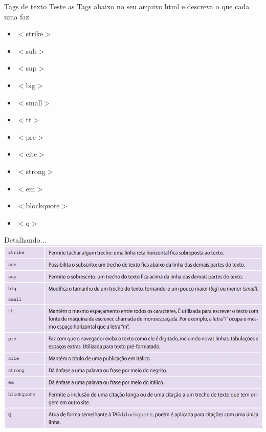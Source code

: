 \documentclass{beamer}
\begin{document}
\begin{frame}{Tags de texto}
 Teste as Tags abaixo no seu arquivo html e descreva o que cada uma faz
\begin{itemize}
 \item $<$strike$>$
  \item $<$sub$>$
  \item $<$sup$>$
  \item $<$big$>$
  \item $<$small$>$
  \item $<$tt$>$
  \item $<$pre$>$
  \item $<$cite$>$
  \item $<$strong$>$
  \item $<$em$>$
  \item $<$blockquote$>$
  \item $<$q$>$
\end{itemize}
\end{frame}
\begin{frame}{Detalhando...}
 \includegraphics[height=0.7\paperheight]{fig/aula1/tagFormata.png} \\
\end{frame}
\end{document}
